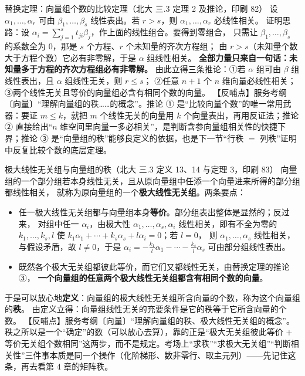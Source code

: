 \begin{fdeep}{替换定理：向量组个数的比较定理（北大 三.3 定理 2 及推论，印刷 82）}
设 $\alpha_1,\dots,\alpha_r$ 可由 $\beta_1,\dots,\beta_s$ 线性表出。若 $r>s$，则 $\alpha_1,\dots,\alpha_r$ 必线性相关。
证明思路：设 $\alpha_i=\sum_{j=1}^{s}t_{ji}\beta_j$，作上面的线性组合。要得到零组合，
只需让 $\beta_1,\dots,\beta_s$ 的系数全为 $0$，那是 $s$ 个方程、$r$ 个未知量的齐次方程组；
由 $r>s$（未知量个数大于方程个数）它必有非零解，于是 $\alpha$ 组线性相关。
\textbf{全部力量只来自一句话：未知量多于方程的齐次方程组必有非零解。}
由此立得三条推论：①若 $\alpha$ 组可由 $\beta$ 组线性表出，且 $\alpha$ 组线性无关，则 $r\le s$；
②任意 $n+1$ 个 $n$ 维向量必线性相关；③两个线性无关且等价的向量组必含有相同个数的向量。
【反哺点】服务考纲〔向量〕“理解向量组的秩……的概念”。推论 ① 是“比较向量个数”的唯一常用武器：要证 $m\le k$，就把 $m$ 个线性无关的向量用 $k$ 个向量表出，再用反证法；推论 ② 直接给出“$n$ 维空间里向量一多必相关”，是判断含参向量组相关性的快捷下界；推论 ③ 是“向量组的秩”能够良定义的依据，也是下一节“行秩 $=$ 列秩”证明中反复比较个数的底层定理。
\end{fdeep}

\begin{fdeep}{极大线性无关组与向量组的秩（北大 三.3 定义 13、14 与定理 3，印刷 83）}
向量组的一个部分组若本身线性无关，且从原向量组中任添一个向量进来所得的部分组都线性相关，
就称为原向量组的一个\textbf{极大线性无关组}。两条要点：
\begin{itemize}[leftmargin=2.2em,itemsep=0.22em]
\item 任一极大线性无关组都与向量组本身\textbf{等价}。部分组表出整体是显然的；反过来，
      对组中任一 $\alpha_i$，由极大性 $\alpha_1,\dots,\alpha_s,\alpha_i$ 线性相关，即有不全为零的
      $k_1,\dots,k_s,l$ 使 $k_1\alpha_1+\cdots+k_s\alpha_s+l\alpha_i=0$；若 $l=0$，
      则 $\alpha_1,\dots,\alpha_s$ 线性相关，与假设矛盾，故 $l\ne0$，于是
      $\alpha_i=-\frac{k_1}{l}\alpha_1-\cdots-\frac{k_s}{l}\alpha_s$ 可由部分组线性表出。
\item 既然各个极大无关组都彼此等价，而它们又都线性无关，由替换定理的推论 ③，
      \textbf{一个向量组的任意两个极大线性无关组都含有相同个数的向量}。
\end{itemize}
于是可以放心地\textbf{定义}：向量组的极大线性无关组所含向量的个数，称为这个向量组的\textbf{秩}。
由定义立得：向量组线性无关的充要条件是它的秩等于它所含向量的个数。
【反哺点】服务考纲〔向量〕“理解向量组的秩、极大线性无关组的概念”。秩之所以是一个“确定”的数（可以放心去算），靠的正是“极大无关组彼此等价 $+$ 等价无关组个数相同”这两步，而不是规定。考场上“求秩”“求极大无关组”“判断相关性”三件事本质是同一个操作（化阶梯形、数非零行、取主元列）——先记住这条，再去看第 4 章的矩阵秩。
\end{fdeep}

